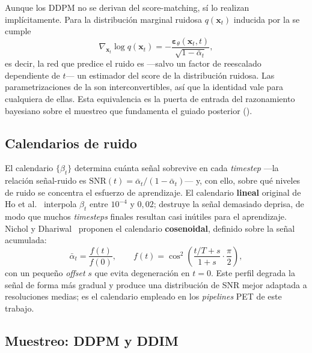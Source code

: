 Aunque los DDPM no se derivan del score-matching, sí lo realizan
implícitamente. Para la distribución marginal ruidosa
$q(\mathbf{x}_t)$ inducida por la  se cumple
\begin{equation}
    \nabla_{\mathbf{x}_t} \log q(\mathbf{x}_t)
    = -\frac{\boldsymbol{\varepsilon}_\theta(\mathbf{x}_t, t)}
            {\sqrt{1-\bar{\alpha}_t}},
    \label{eq:score-eps}
\end{equation}
es decir, la red que predice el ruido es —salvo un factor de
reescalado dependiente de $t$— un estimador del score de la
distribución ruidosa. Las parametrizaciones de la
 son interconvertibles, así que la
identidad vale para cualquiera de ellas. Esta equivalencia es la
puerta de entrada del razonamiento bayesiano sobre el muestreo que
fundamenta el guiado posterior
().

\subsection{Calendarios de ruido}
\label{subsec:schedules}

El calendario $\{\beta_t\}$ determina cuánta señal sobrevive en cada
\textit{timestep} —la relación señal-ruido es
$\mathrm{SNR}(t) = \bar{\alpha}_t / (1-\bar{\alpha}_t)$— y, con ello,
sobre qué niveles de ruido se concentra el esfuerzo de aprendizaje.
El calendario \textbf{lineal} original de Ho et al.~\cite{ho2020ddpm}
interpola $\beta_t$ entre $10^{-4}$ y $0{,}02$; destruye la señal
demasiado deprisa, de modo que muchos \textit{timesteps} finales
resultan casi inútiles para el aprendizaje. Nichol y
Dhariwal~\cite{nichol2021cosine} proponen el calendario
\textbf{cosenoidal}, definido sobre la señal acumulada:
\begin{equation}
    \bar{\alpha}_t = \frac{f(t)}{f(0)},
    \qquad
    f(t) = \cos^2\!\left(
        \frac{t/T + s}{1 + s}\cdot\frac{\pi}{2}
    \right),
    \label{eq:cosine-schedule}
\end{equation}
con un pequeño \textit{offset} $s$ que evita degeneración en $t=0$.
Este perfil degrada la señal de forma más gradual y produce una
distribución de SNR mejor adaptada a resoluciones medias; es el
calendario empleado en los \textit{pipelines} PET de este trabajo.

\subsection{Muestreo: DDPM y DDIM}
\label{subsec:muestreo}

